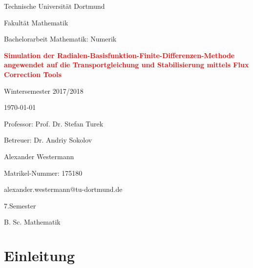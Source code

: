 \documentclass[a4paper,11pt]{article}
\begin{document}
\begin{titlepage}
 \centering
 {\LARGE Technische Universität Dortmund \par}
 \vspace{0.5cm}
 {\LARGE Fakultät Mathematik \par}
 \vspace{1cm}
 {\Large Bachelorarbeit Mathematik: Numerik \par}
 \vspace{2cm}
 {\huge\bfseries \textcolor{red}{Simulation der Radialen-Basisfunktion-Finite-Differenzen-Methode angewendet auf die Transportgleichung und Stabilisierung mittels Flux Correction Tools} \par}
 \vspace{2cm}
 {\Large Wintersemester 2017/2018 \par}
 \vspace{0.5cm}
 {\large \today\par}
 \vspace{2cm}
 {\Large Professor: Prof. Dr. Stefan Turek \par}
 \vspace{0.5cm}
 {\Large Betreuer: Dr. Andriy Sokolov \par}
 \vfill
 \begin{flushright}
  {Alexander Westermann \par}
  {Matrikel-Nummer: 175180 \par}
  \vspace{0.5cm}
  {alexander.westermann@tu-dortmund.de \par}
  {7.Semester \par}
  {B. Sc. Mathematik \par}
 \end{flushright}
\end{titlepage}
\pagebreak
{}
 \tableofcontents
\pagebreak
\listoffigures
\pagebreak
{}
\setcounter{page}{1}
\section{Einleitung}
\pagebreak
\end{document}
